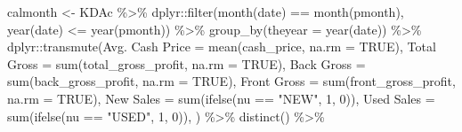 \documentclass[
]{article}
\newenvironment{Shaded}{\begin{snugshade}}{\end{snugshade}}
\newcommand{\AttributeTok}[1]{\textcolor[rgb]{0.77,0.63,0.00}{#1}}
\newcommand{\ConstantTok}[1]{\textcolor[rgb]{0.00,0.00,0.00}{#1}}
\newcommand{\DecValTok}[1]{\textcolor[rgb]{0.00,0.00,0.81}{#1}}
\newcommand{\FunctionTok}[1]{\textcolor[rgb]{0.00,0.00,0.00}{#1}}
\newcommand{\NormalTok}[1]{#1}
\newcommand{\OtherTok}[1]{\textcolor[rgb]{0.56,0.35,0.01}{#1}}
\newcommand{\SpecialCharTok}[1]{\textcolor[rgb]{0.00,0.00,0.00}{#1}}
\newcommand{\StringTok}[1]{\textcolor[rgb]{0.31,0.60,0.02}{#1}}
\begin{document}
\begin{Shaded}
\begin{Highlighting}[]
\NormalTok{calmonth }\OtherTok{\textless{}{-}}\NormalTok{ KDAc }\SpecialCharTok{\%\textgreater{}\%}
\NormalTok{  dplyr}\SpecialCharTok{::}\FunctionTok{filter}\NormalTok{(}\FunctionTok{month}\NormalTok{(date) }\SpecialCharTok{==} \FunctionTok{month}\NormalTok{(pmonth), }\FunctionTok{year}\NormalTok{(date) }\SpecialCharTok{\textless{}=} \FunctionTok{year}\NormalTok{(pmonth)) }\SpecialCharTok{\%\textgreater{}\%}
  \FunctionTok{group\_by}\NormalTok{(}\AttributeTok{theyear =} \FunctionTok{year}\NormalTok{(date)) }\SpecialCharTok{\%\textgreater{}\%}
\NormalTok{  dplyr}\SpecialCharTok{::}\FunctionTok{transmute}\NormalTok{(}\StringTok{\textasciigrave{}}\AttributeTok{Avg. Cash Price}\StringTok{\textasciigrave{}} \OtherTok{=} \FunctionTok{mean}\NormalTok{(cash\_price, }\AttributeTok{na.rm =} \ConstantTok{TRUE}\NormalTok{),}
                   \StringTok{\textasciigrave{}}\AttributeTok{Total Gross}\StringTok{\textasciigrave{}} \OtherTok{=} \FunctionTok{sum}\NormalTok{(total\_gross\_profit, }\AttributeTok{na.rm =} \ConstantTok{TRUE}\NormalTok{),}
                   \StringTok{\textasciigrave{}}\AttributeTok{Back Gross}\StringTok{\textasciigrave{}} \OtherTok{=} \FunctionTok{sum}\NormalTok{(back\_gross\_profit, }\AttributeTok{na.rm =} \ConstantTok{TRUE}\NormalTok{),}
                   \StringTok{\textasciigrave{}}\AttributeTok{Front Gross}\StringTok{\textasciigrave{}} \OtherTok{=} \FunctionTok{sum}\NormalTok{(front\_gross\_profit, }\AttributeTok{na.rm =} \ConstantTok{TRUE}\NormalTok{),}
                   \StringTok{\textasciigrave{}}\AttributeTok{New Sales}\StringTok{\textasciigrave{}} \OtherTok{=} \FunctionTok{sum}\NormalTok{(}\FunctionTok{ifelse}\NormalTok{(nu }\SpecialCharTok{==} \StringTok{"NEW"}\NormalTok{, }\DecValTok{1}\NormalTok{, }\DecValTok{0}\NormalTok{)),}
                   \StringTok{\textasciigrave{}}\AttributeTok{Used Sales}\StringTok{\textasciigrave{}} \OtherTok{=} \FunctionTok{sum}\NormalTok{(}\FunctionTok{ifelse}\NormalTok{(nu }\SpecialCharTok{==} \StringTok{"USED"}\NormalTok{, }\DecValTok{1}\NormalTok{, }\DecValTok{0}\NormalTok{)),}
\NormalTok{                   ) }\SpecialCharTok{\%\textgreater{}\%}
  \FunctionTok{distinct}\NormalTok{() }\SpecialCharTok{\%\textgreater{}\%}
  

\end{Highlighting}
\end{Shaded}
\end{document}
